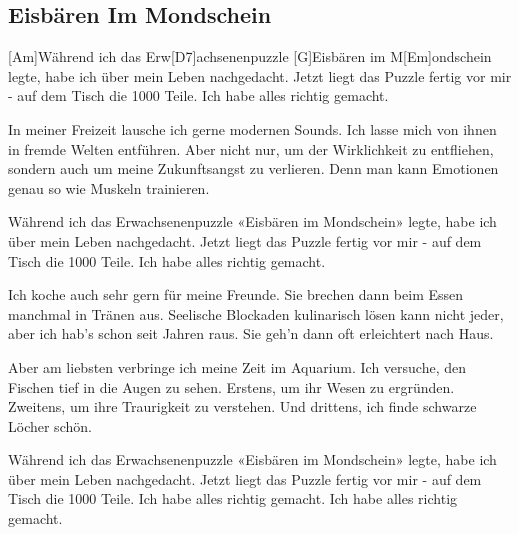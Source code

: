 \subsection*{Eisbären Im Mondschein   }
\begin{guitar}

[Am]Während ich das Erw[D7]achsenenpuzzle [G]Eisbären im M[Em]ondschein legte,
habe ich über mein Leben nachgedacht.
Jetzt liegt das Puzzle fertig vor mir - auf dem Tisch die 1000 Teile.
Ich habe alles richtig gemacht.



In meiner Freizeit lausche ich gerne modernen Sounds.
Ich lasse mich von ihnen in fremde Welten entführen.
Aber nicht nur, um der Wirklichkeit zu entfliehen,
sondern auch um meine Zukunftsangst zu verlieren.
Denn man kann Emotionen genau so wie Muskeln trainieren.



Während ich das Erwachsenenpuzzle «Eisbären im Mondschein» legte,
habe ich über mein Leben nachgedacht.
Jetzt liegt das Puzzle fertig vor mir - auf dem Tisch die 1000 Teile.
Ich habe alles richtig gemacht.



Ich koche auch sehr gern für meine Freunde.
Sie brechen dann beim Essen manchmal in Tränen aus.
Seelische Blockaden kulinarisch lösen kann nicht jeder,
aber ich hab's schon seit Jahren raus.
Sie geh'n dann oft erleichtert nach Haus.



Aber am liebsten verbringe ich meine Zeit im Aquarium.
Ich versuche, den Fischen tief in die Augen zu sehen.
Erstens, um ihr Wesen zu ergründen.
Zweitens, um ihre Traurigkeit zu verstehen.
Und drittens, ich finde schwarze Löcher schön.



Während ich das Erwachsenenpuzzle «Eisbären im Mondschein» legte,
habe ich über mein Leben nachgedacht.
Jetzt liegt das Puzzle fertig vor mir - auf dem Tisch die 1000 Teile.
Ich habe alles richtig gemacht.
Ich habe alles richtig gemacht. 	 
\end{guitar}

